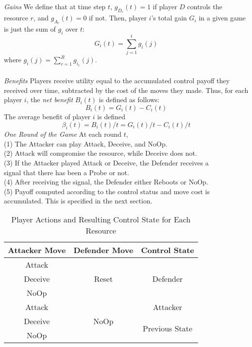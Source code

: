 \documentclass[11pt]{article}
\theoremstyle{plain}
\newcommand\tab[1][1cm]{\hspace*{#1}}
\begin{document}
    \textit{Gains} \hspace*{0.1cm}
    We define that at time step $t$, $g_{D_r}(t) = 1$ if player $D$ controls the resource $r$, and $g_{A_r}(t)=0$ if not. 
    Then, player $i$’s total gain $G_i$ in a given game is
    just the sum of $g_i$  over $t$:
    $$G_i(t) = \sum_{j=1}^{t} g_i(j)$$
    where $g_i(j) = \sum_{r=1}^{R} g_{i_r}(j)$.
    ~\\\\
    \textit{Benefits} \hspace*{0.1cm}
    Players receive utility equal to the accumulated control payoff they received over time, subtracted by the cost of the moves they made. 
    Thus, for each player $i$, the \textit{net benefit} $B_i(t)$ is defined as follows:
    $$B_i(t) = G_i(t) - C_i(t)$$
    The average benefit of player $i$ is defined
    $$\beta_i(t) = B_i(t)/t = G_i(t)/t - C_i(t)/t$$
    \noindent
    \textit{One Round of the Game} \hspace*{0.1cm}
    \noindent At each round $t$, 
    \\\tab (1) The Attacker can play Attack, Deceive, and NoOp.
    \\\tab (2) Attack will compromise the resource, while Deceive does not.
    \\\tab (3) If the Attacker played Attack or Deceive, the Defender receives a 
    \\\tab \hspace*{0.48cm} signal that there has been a Probe or not.
    \\\tab (4) After receiving the signal, the Defender either Reboots or NoOp.
    \\\tab (5) Payoff computed according to the control status and move cost is 
    \\\tab \hspace*{0.46cm} accumulated. This is specified in the next section.

\begin{table}[!htbp]
\centering
\caption{Player Actions and Resulting Control State for Each Resource}
\label{my-label}
\begin{tabular}{|c|c|c|}
\hline
\textbf{Attacker Move} & \textbf{Defender Move} & \textbf{Control State}          \\ \hline
Attack                 & \multirow{3}{*}{Reset} & \multirow{3}{*}{Defender}       \\ \cline{1-1}
Deceive                &                        &                                 \\ \cline{1-1}
NoOp                   &                        &                                 \\ \hline
Attack                 & \multirow{3}{*}{NoOp}  & Attacker                        \\ \cline{1-1} \cline{3-3} 
Deceive                &                        & \multirow{2}{*}{Previous State} \\ \cline{1-1}
NoOp                   &                        &                                 \\ \hline
\end{tabular}
\end{table}
\end{document}
